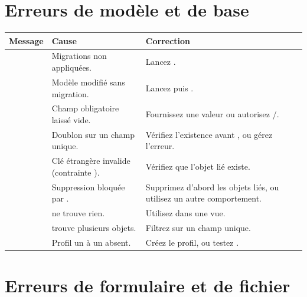 \section{Erreurs de modèle et de base}

\begin{longtable}{L{5.2cm} L{4.5cm} L{4.7cm}}
\toprule
\textbf{Message} & \textbf{Cause} & \textbf{Correction} \\
\midrule
\endhead
\footnotesize
{} & Migrations non appliquées. & Lancez . \\
 & Modèle modifié sans migration. & Lancez
 puis . \\
 & Champ obligatoire laissé vide. & Fournissez
une valeur ou autorisez /. \\
 & Doublon sur un champ unique. & Vérifiez
l'existence avant , ou gérez l'erreur. \\
 & Clé étrangère invalide (contrainte
). &
Vérifiez que l'objet lié existe. \\
 & Suppression bloquée par . & Supprimez
d'abord les objets liés, ou utilisez un autre comportement. \\
 &  ne trouve rien. & Utilisez
 dans une vue. \\
 &  trouve plusieurs objets. & Filtrez
sur un champ unique. \\
 & Profil un à un absent. & Créez le profil, ou
testez . \\
\bottomrule
\end{longtable}

\section{Erreurs de formulaire et de fichier}

